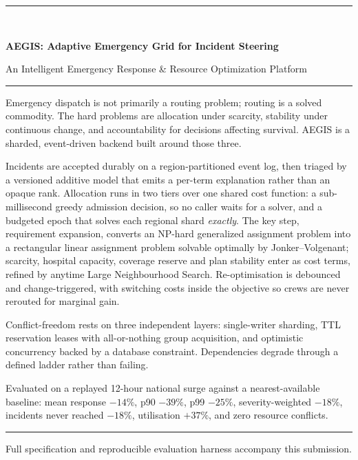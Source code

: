 \documentclass[11pt,a4paper]{article}
\begin{document}
\begin{center}
{\color{accent}\rule{\textwidth}{1.4pt}}\\[3mm]
{\LARGE\bfseries AEGIS: Adaptive Emergency Grid for Incident Steering\par}
\vspace{1.5mm}
{\normalsize An Intelligent Emergency Response \& Resource Optimization Platform\par}
\vspace{2mm}
{\color{accent}\rule{\textwidth}{1.4pt}}
\end{center}

\vspace{2mm}

Emergency dispatch is not primarily a routing problem; routing is a solved
commodity. The hard problems are allocation under scarcity, stability under
continuous change, and accountability for decisions affecting survival. AEGIS
is a sharded, event-driven backend built around those three.

Incidents are accepted durably on a region-partitioned event log, then triaged
by a versioned additive model that emits a per-term explanation rather than an
opaque rank. Allocation runs in two tiers over one shared cost function: a
sub-millisecond greedy admission decision, so no caller waits for a solver,
and a budgeted epoch that solves each regional shard \emph{exactly}. The key step,
requirement expansion, converts an NP-hard generalized assignment problem into
a rectangular linear assignment problem solvable optimally by
Jonker--Volgenant; scarcity, hospital capacity, coverage reserve
and plan stability enter as cost terms, refined by anytime Large Neighbourhood
Search. Re-optimisation is debounced and change-triggered, with switching costs
inside the objective so crews are never rerouted for marginal gain.

Conflict-freedom rests on three independent layers: single-writer sharding, TTL
reservation leases with all-or-nothing group acquisition, and optimistic
concurrency backed by a database constraint. Dependencies degrade through a
defined ladder rather than failing.

Evaluated on a replayed 12-hour national surge against a nearest-available
baseline: mean response $-14\%$, p90 $-39\%$, p99 $-25\%$, severity-weighted
$-18\%$, incidents never reached $-18\%$, utilisation $+37\%$, and zero
resource conflicts.

\vfill
{\color{muted}\footnotesize\hrule\vspace{2mm}
Full specification and reproducible evaluation harness accompany this submission.}
\end{document}
